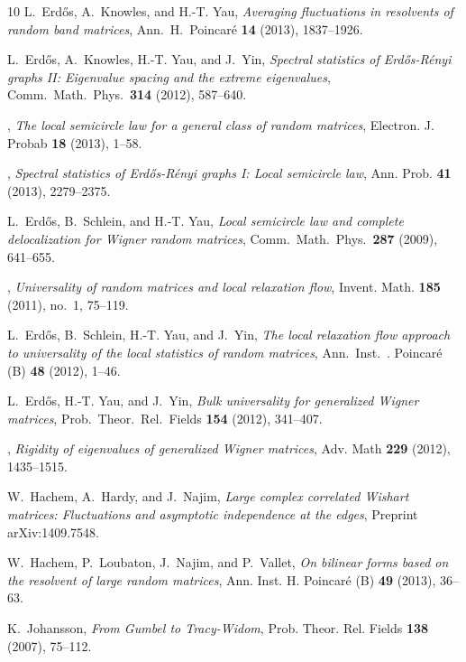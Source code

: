 \documentclass[11pt]{article} %
\numberwithin{equation}{section}
\numberwithin{figure}{section}
\theoremstyle{plain} %
\theoremstyle{definition} %
\begin{document}
{\begin{thebibliography}{10}
L.~Erd{\H{o}}s, A.~Knowles, and H.-T. Yau, \emph{Averaging fluctuations in
  resolvents of random band matrices}, Ann.\ H.\ Poincar{\'e} \textbf{14}
  (2013), 1837--1926.

L.~Erd{\H{o}}s, A.~Knowles, H.-T. Yau, and J.~Yin, \emph{Spectral statistics of
  {E}rd{\H{o}}s-{R}\'enyi graphs {II}: Eigenvalue spacing and the extreme
  eigenvalues}, Comm.\ Math.\ Phys.\ \textbf{314} (2012), 587--640.

\bysame, \emph{The local semicircle law for a general class of random
  matrices}, Electron. J. Probab \textbf{18} (2013), 1--58.

\bysame, \emph{Spectral statistics of {E}rd{\H{o}}s-{R}\'enyi graphs {I}: Local
  semicircle law}, Ann. Prob. \textbf{41} (2013), 2279--2375.

L.~Erd{\H{o}}s, B.~Schlein, and H.-T. Yau, \emph{Local semicircle law and
  complete delocalization for {W}igner random matrices}, Comm.\ Math.\ Phys.\
  \textbf{287} (2009), 641--655.

\bysame, \emph{Universality of random matrices and local relaxation flow},
  Invent. Math. \textbf{185} (2011), no.~1, 75--119.

L.~Erd{\H{o}}s, B.~Schlein, H.-T. Yau, and J.~Yin, \emph{The local relaxation
  flow approach to universality of the local statistics of random matrices},
  Ann.\ Inst.\ . Poincar{\'e} (B) \textbf{48} (2012), 1--46.

L.~Erd{\H{o}}s, H.-T. Yau, and J.~Yin, \emph{Bulk universality for generalized
  {W}igner matrices}, Prob.\ Theor.\ Rel.\ Fields \textbf{154} (2012),
  341--407.

\bysame, \emph{Rigidity of eigenvalues of generalized {W}igner matrices}, Adv.
  Math \textbf{229} (2012), 1435--1515.

W.~Hachem, A.~Hardy, and J.~Najim, \emph{Large complex correlated {W}ishart
  matrices: Fluctuations and asymptotic independence at the edges}, Preprint
  arXiv:1409.7548.

W.~Hachem, P.~Loubaton, J.~Najim, and P.~Vallet, \emph{On bilinear forms based
  on the resolvent of large random matrices}, Ann. Inst. H. Poincar{\'e} (B)
  \textbf{49} (2013), 36--63.

K.~Johansson, \emph{From {G}umbel to {T}racy-{W}idom}, Prob. Theor. Rel. Fields
  \textbf{138} (2007), 75--112.


\end{thebibliography}}
\end{document}
